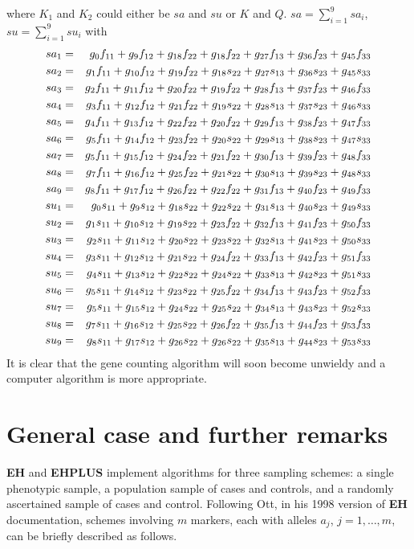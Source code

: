 where $K_1$ and $K_2$ could either be $sa$ and $su$ or $K$ and $Q$.
$sa=\sum_{i=1}^9 sa_i$, $su=\sum_{i=1}^9 su_i$ with
\begin{eqnarray*}
sa_1&=&g_{0} f_{11}+g_{9}  f_{12}+g_{18} f_{22}+g_{18} f_{22}+g_{27}f_{13}+g_{36} f_{23}+g_{45} f_{33}\cr
sa_2&=&g_{1} f_{11}+g_{10} f_{12}+g_{19} f_{22}+g_{18} s_{22}+g_{27}s_{13}+g_{36} s_{23}+g_{45} s_{33}\cr
sa_3&=&g_{2} f_{11}+g_{11} f_{12}+g_{20} f_{22}+g_{19} f_{22}+g_{28}f_{13}+g_{37} f_{23}+g_{46} f_{33}\cr
sa_4&=&g_{3} f_{11}+g_{12} f_{12}+g_{21} f_{22}+g_{19} s_{22}+g_{28}s_{13}+g_{37} s_{23}+g_{46} s_{33}\cr
sa_5&=&g_{4} f_{11}+g_{13} f_{12}+g_{22} f_{22}+g_{20} f_{22}+g_{29}f_{13}+g_{38} f_{23}+g_{47} f_{33}\cr
sa_6&=&g_{5} f_{11}+g_{14} f_{12}+g_{23} f_{22}+g_{20} s_{22}+g_{29}s_{13}+g_{38} s_{23}+g_{47} s_{33}\cr
sa_7&=&g_{5} f_{11}+g_{15} f_{12}+g_{24} f_{22}+g_{21} f_{22}+g_{30}f_{13}+g_{39} f_{23}+g_{48} f_{33}\cr
sa_8&=&g_{7} f_{11}+g_{16} f_{12}+g_{25} f_{22}+g_{21} s_{22}+g_{30}s_{13}+g_{39} s_{23}+g_{48} s_{33}\cr
sa_9&=&g_{8} f_{11}+g_{17} f_{12}+g_{26} f_{22}+g_{22} f_{22}+g_{31}f_{13}+g_{40} f_{23}+g_{49} f_{33}\cr
su_1&=&g_{0} s_{11}+g_{9}  s_{12}+g_{18} s_{22}+g_{22} s_{22}+g_{31}s_{13}+g_{40} s_{23}+g_{49} s_{33}\cr
su_2&=&g_{1} s_{11}+g_{10} s_{12}+g_{19} s_{22}+g_{23} f_{22}+g_{32}f_{13}+g_{41} f_{23}+g_{50} f_{33}\cr
su_3&=&g_{2} s_{11}+g_{11} s_{12}+g_{20} s_{22}+g_{23} s_{22}+g_{32}s_{13}+g_{41} s_{23}+g_{50} s_{33}\cr
su_4&=&g_{3} s_{11}+g_{12} s_{12}+g_{21} s_{22}+g_{24} f_{22}+g_{33}f_{13}+g_{42} f_{23}+g_{51} f_{33}\cr
su_5&=&g_{4} s_{11}+g_{13} s_{12}+g_{22} s_{22}+g_{24} s_{22}+g_{33}s_{13}+g_{42} s_{23}+g_{51} s_{33}\cr
su_6&=&g_{5} s_{11}+g_{14} s_{12}+g_{23} s_{22}+g_{25} f_{22}+g_{34}f_{13}+g_{43} f_{23}+g_{52} f_{33}\cr
su_7&=&g_{5} s_{11}+g_{15} s_{12}+g_{24} s_{22}+g_{25} s_{22}+g_{34}s_{13}+g_{43} s_{23}+g_{52} s_{33}\cr
su_8&=&g_{7} s_{11}+g_{16} s_{12}+g_{25} s_{22}+g_{26} f_{22}+g_{35}f_{13}+g_{44} f_{23}+g_{53} f_{33}\cr
su_9&=&g_{8} s_{11}+g_{17} s_{12}+g_{26} s_{22}+g_{26} s_{22}+g_{35}s_{13}+g_{44} s_{23}+g_{53} s_{33}
\end{eqnarray*}
It is clear that the gene counting algorithm will soon become unwieldy and a
computer algorithm is more appropriate.


\section*{General case and further remarks}\label{twob}

{\bf EH} and {\bf EHPLUS} implement algorithms for three sampling schemes:  a
single phenotypic sample, a population sample of cases and controls, and a
randomly ascertained sample of cases and control.  Following Ott, in his 1998
version of {\bf EH} documentation, schemes involving $m$ markers, each with
alleles $a_j$, $j=1,\ldots, m$, can be briefly described as follows.


